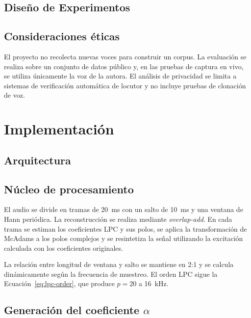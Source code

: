\documentclass[10pt,twocolumn]{article}
\begin{document}
\subsection{Diseño de Experimentos}

\subsection{Consideraciones éticas}

El proyecto no recolecta nuevas voces para construir un corpus. La evaluación
se realiza sobre un conjunto de datos público y, en las pruebas de captura en
vivo, se utiliza únicamente la voz de la autora. El análisis de privacidad se
limita a sistemas de verificación automática de locutor y no incluye pruebas de
clonación de voz.

\section{Implementación}

\subsection{Arquitectura}


\subsection{Núcleo de procesamiento}

El audio se divide en tramas de 20~ms con un salto de 10~ms y una ventana de
Hann periódica. La reconstrucción se realiza mediante \textit{overlap-add}. En
cada trama se estiman los coeficientes LPC y sus polos, se aplica la
transformación de McAdams a los polos complejos y se resintetiza la señal
utilizando la excitación calculada con los coeficientes originales.

La relación entre longitud de ventana y salto se mantiene en 2:1 y se calcula
dinámicamente según la frecuencia de muestreo. El orden LPC sigue la
Ecuación~\eqref{eq:lpc-order}, que produce $p=20$ a 16~kHz.

\subsection{Generación del coeficiente \texorpdfstring{$\alpha$}{alfa}}
\end{document}
